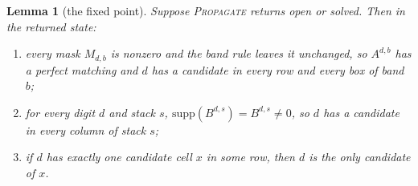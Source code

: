 \documentclass[11pt]{article}
\newtheorem{lemma}[theorem]{Lemma}
\theoremstyle{definition}
\theoremstyle{plain}
\let\origtextsc\textsc
\renewcommand{\textsc}[1]{\textup{\origtextsc{#1}}}
\begin{document}
\begin{lemma}[the fixed point]
\label{lem:fixedpoint}
Suppose \textsc{Propagate} returns \emph{open} or \emph{solved}. Then in the returned state:
\begin{enumerate}
\item[(a)] every mask $M_{d,b}$ is nonzero and the band rule leaves it unchanged, so $A^{d,b}$ has a perfect matching
  and $d$ has a candidate in every row and every box of band $b$;
\item[(b)] for every digit $d$ and stack $s$, $\mathrm{supp}(B^{d,s})=B^{d,s}\neq 0$, so $d$ has a candidate in every
  column of stack $s$;
\item[(c)] if $d$ has exactly one candidate cell $x$ in some row, then $d$ is the only candidate of $x$.
\end{enumerate}
\end{lemma}
\end{document}
